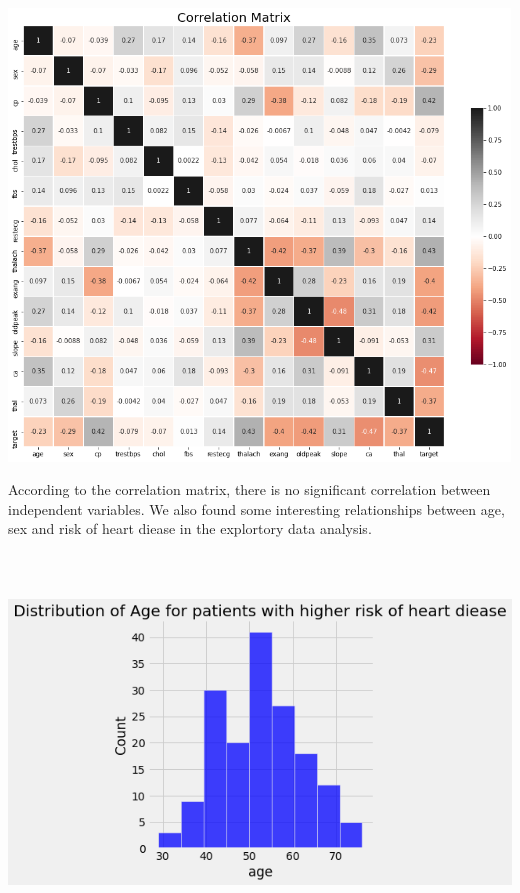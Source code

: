 \documentclass[12pt]{article}
\begin{document}
\begin{center}
    \includegraphics[width=\textwidth, height=12cm, keepaspectratio]{images/image5.png}
\end{center}


According to the correlation matrix, there is no significant correlation between independent variables.
We  also found some interesting relationships between age, sex and risk of heart diease in the explortory data analysis.
\begin{center}
    \includegraphics[width=\textwidth, height=10cm, keepaspectratio]{images/image2.png}
\end{center}
\end{document}
